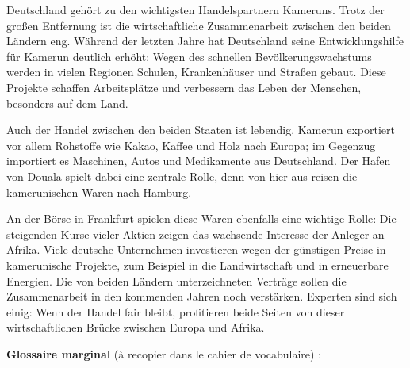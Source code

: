 \documentclass[11pt]{article}
\begin{document}
\begin{textebox}
Deutschland gehört zu den wichtigsten Handelspartnern Kameruns. Trotz der großen Entfernung ist die wirtschaftliche Zusammenarbeit zwischen den beiden Ländern eng. Während der letzten Jahre hat Deutschland seine Entwicklungshilfe für Kamerun deutlich erhöht: Wegen des schnellen Bevölkerungswachstums werden in vielen Regionen Schulen, Krankenhäuser und Straßen gebaut. Diese Projekte schaffen Arbeitsplätze und verbessern das Leben der Menschen, besonders auf dem Land.

Auch der Handel zwischen den beiden Staaten ist lebendig. Kamerun exportiert vor allem Rohstoffe wie Kakao, Kaffee und Holz nach Europa; im Gegenzug importiert es Maschinen, Autos und Medikamente aus Deutschland. Der Hafen von Douala spielt dabei eine zentrale Rolle, denn von hier aus reisen die kamerunischen Waren nach Hamburg.

An der Börse in Frankfurt spielen diese Waren ebenfalls eine wichtige Rolle: Die steigenden Kurse vieler Aktien zeigen das wachsende Interesse der Anleger an Afrika. Viele deutsche Unternehmen investieren wegen der günstigen Preise in kamerunische Projekte, zum Beispiel in die Landwirtschaft und in erneuerbare Energien. Die von beiden Ländern unterzeichneten Verträge sollen die Zusammenarbeit in den kommenden Jahren noch verstärken. Experten sind sich einig: Wenn der Handel fair bleibt, profitieren beide Seiten von dieser wirtschaftlichen Brücke zwischen Europa und Afrika.
\end{textebox}

\textbf{Glossaire marginal} (à recopier dans le cahier de vocabulaire) :
\end{document}
